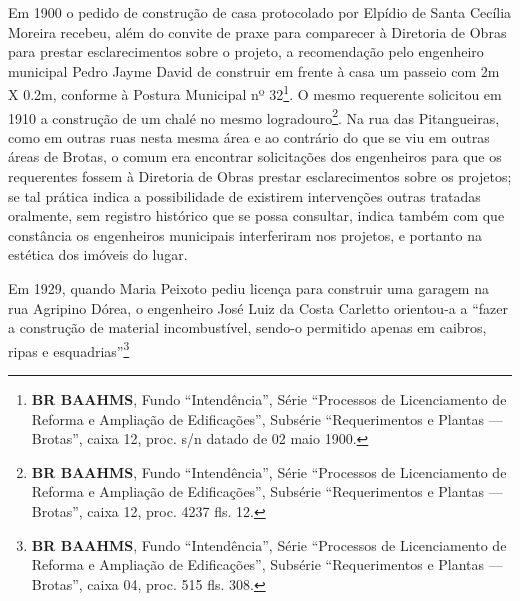 Em 1900 o pedido de construção de casa protocolado por Elpídio de Santa Cecília Moreira recebeu, além do convite de praxe para comparecer à Diretoria de Obras para prestar esclarecimentos sobre o projeto, a recomendação pelo engenheiro municipal Pedro Jayme David de construir em frente à casa um passeio com 2m X 0.2m, conforme à Postura Municipal nº 32\footnote{\textbf{BR BAAHMS}, Fundo ``Intendência'', Série ``Processos de Licenciamento de Reforma e Ampliação de Edificações'', Subsérie ``Requerimentos e Plantas --- Brotas'', caixa 12, proc. s/n datado de 02 maio 1900.}. O mesmo requerente solicitou em 1910 a construção de um chalé no mesmo logradouro\footnote{\textbf{BR BAAHMS}, Fundo ``Intendência'', Série ``Processos de Licenciamento de Reforma e Ampliação de Edificações'', Subsérie ``Requerimentos e Plantas --- Brotas'', caixa 12, proc. 4237 fls. 12.}. Na rua das Pitangueiras, como em outras ruas nesta mesma área e ao contrário do que se viu em outras áreas de Brotas, o comum era encontrar solicitações dos engenheiros para que os requerentes fossem à Diretoria de Obras prestar esclarecimentos sobre os projetos; se tal prática indica a possibilidade de existirem intervenções outras tratadas oralmente, sem registro histórico que se possa consultar, indica também com que constância os engenheiros municipais interferiram nos projetos, e portanto na estética dos imóveis do lugar.

Em 1929, quando Maria Peixoto pediu licença para construir uma garagem na rua Agripino Dórea, o engenheiro José Luiz da Costa Carletto orientou-a a ``fazer a construção de material incombustível, sendo-o permitido apenas em caibros, ripas e esquadrias''\footnote{\textbf{BR BAAHMS}, Fundo ``Intendência'', Série ``Processos de Licenciamento de Reforma e Ampliação de Edificações'', Subsérie ``Requerimentos e Plantas --- Brotas'', caixa 04, proc. 515 fls. 308.}

